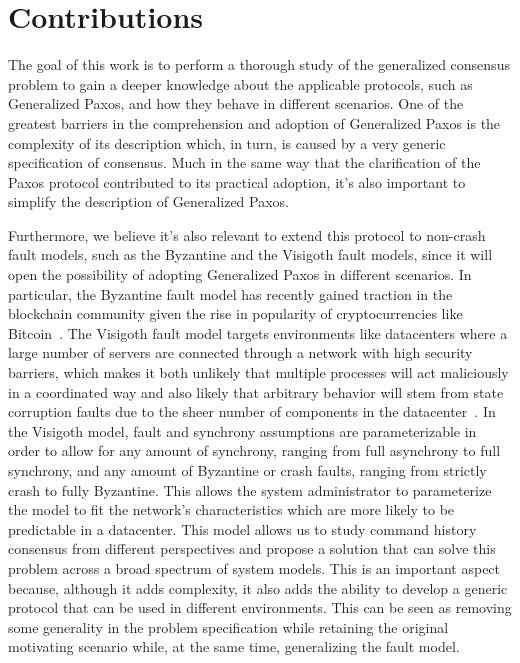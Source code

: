 \section{Contributions}
The goal of this work is to perform a thorough study of the generalized consensus problem to gain a deeper knowledge about the applicable protocols, such as Generalized Paxos, and how they behave in different scenarios. One of the greatest barriers in the comprehension and adoption of Generalized Paxos is the complexity of its description which, in turn, is caused by a very generic specification of consensus. Much in the same way that the clarification of the Paxos protocol contributed to its practical adoption, it's also important to simplify the description of Generalized Paxos. \par
Furthermore, we believe it's also relevant to extend this protocol to non-crash fault models, such as the Byzantine and the Visigoth fault models, since it will open the possibility of adopting Generalized Paxos in different scenarios. In particular, the Byzantine fault model has recently gained traction in the blockchain community given the rise in popularity of cryptocurrencies like Bitcoin~\cite{bitcoin}. The Visigoth fault model targets environments like datacenters where a large number of servers are connected through a network with high security barriers, which makes it both unlikely that multiple processes will act maliciously in a coordinated way and also likely that arbitrary behavior will stem from state corruption faults due to the sheer number of components in the datacenter~\cite{Porto2015}. In the Visigoth model, fault and synchrony assumptions are parameterizable in order to allow for any amount of synchrony, ranging from full asynchrony to full synchrony, and any amount of Byzantine or crash faults, ranging from strictly crash to fully Byzantine. This allows the system administrator to parameterize the model to fit the network's characteristics which are more likely to be predictable in a datacenter. This model allows us to study command history consensus from different perspectives and propose a solution that can solve this problem across a broad spectrum of system models. This is an important aspect because, although it adds complexity, it also adds the ability to develop a generic protocol that can be used in different environments. This can be seen as removing some generality in the problem specification while retaining the original motivating scenario while, at the same time, generalizing the fault model.
\par
